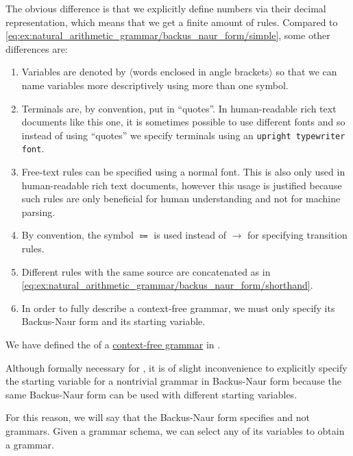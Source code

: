 \begin{example}
  The obvious difference is that we explicitly define numbers via their decimal representation, which means that we get a finite amount of rules. Compared to \eqref{eq:ex:natural_arithmetic_grammar/backus_naur_form/simple}, some other differences are:
  \begin{enumerate}
    \item Variables are denoted by \( \langle \)words enclosed in angle brackets\( \rangle \) so that we can name variables more descriptively using more than one symbol.
    \item Terminals are, by convention, put in \enquote{quotes}. In human-readable rich text documents like this one, it is sometimes possible to use different fonts and so instead of using \enquote{quotes} we specify terminals using an \texttt{upright typewriter font}.
    \item Free-text rules can be specified using a normal font. This is also only used in human-readable rich text documents, however this usage is justified because such rules are only beneficial for human understanding and not for machine parsing.
    \item By convention, the symbol \( \Coloneqq \) is used instead of \( \to \) for specifying transition rules.
    \item Different rules with the same source are concatenated as in \eqref{eq:ex:natural_arithmetic_grammar/backus_naur_form/shorthand}.
    \item In order to fully describe a context-free grammar, we must only specify its Backus-Naur form and its starting variable.
  \end{enumerate}
\end{example}

\begin{definition}\label{def:backus_naur_form}
  We have defined the  of a \hyperref[def:grammar/context_free]{context-free grammar} in .

  Although formally necessary for , it is of slight inconvenience to explicitly specify the starting variable for a nontrivial grammar in Backus-Naur form because the same Backus-Naur form can be used with different starting variables.

  For this reason, we will say that the Backus-Naur form specifies  and not grammars. Given a grammar schema, we can select any of its variables to obtain a grammar.
\end{definition}

